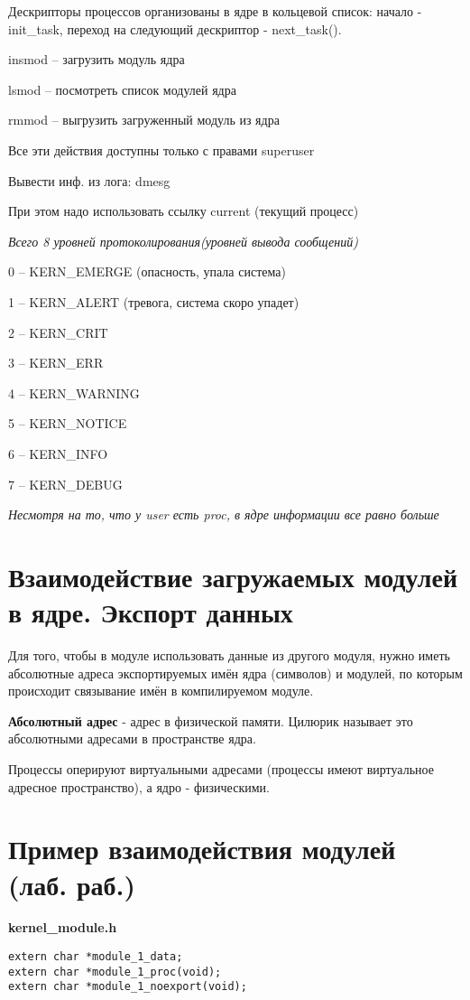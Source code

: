 Дескрипторы процессов организованы в ядре в кольцевой список: начало - init\_task, переход на следующий дескриптор - next\_task().

insmod -- загрузить модуль ядра

lsmod -- посмотреть список модулей ядра

rmmod -- выгрузить загруженный модуль из ядра

Все эти действия доступны только с правами superuser

Вывести инф. из лога: dmesg

При этом надо использовать ссылку current (текущий процесс)

\textit{Всего 8 уровней протоколирования(уровней вывода сообщений)}

0 -- KERN\_EMERGE (опасность, упала система)

1 -- KERN\_ALERT (тревога, система скоро упадет)

2 -- KERN\_CRIT 

3 -- KERN\_ERR 

4 -- KERN\_WARNING 

5 -- KERN\_NOTICE 

6 -- KERN\_INFO 

7 -- KERN\_DEBUG 


\textit{Несмотря на то, что у user есть proc, в ядре информации все равно больше}

\section{Взаимодействие загружаемых модулей в ядре. Экспорт данных}

Для того, чтобы в модуле использовать данные из другого модуля, нужно иметь абсолютные адреса экспортируемых имён ядра (символов) и модулей, по которым происходит связывание имён в компилируемом модуле.

\textbf{Абсолютный адрес} - адрес в физической памяти. Цилюрик называет это абсолютными адресами в пространстве ядра.

Процессы оперируют виртуальными адресами (процессы имеют виртуальное адресное пространство), а ядро - физическими.

\section{Пример взаимодействия модулей (лаб. раб.)}
\textbf{kernel\_module.h}
\begin{lstlisting}
extern char *module_1_data;
extern char *module_1_proc(void);
extern char *module_1_noexport(void);
\end{lstlisting}

